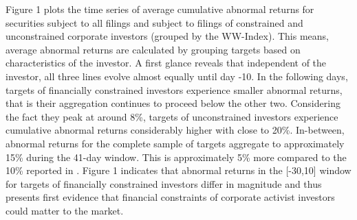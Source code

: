 \documentclass[12pt]{article}
\begin{document}
Figure 1 plots the time series of average cumulative abnormal returns for securities subject to all filings and subject to filings of constrained and unconstrained corporate investors (grouped by the WW-Index). This means, average abnormal returns are calculated by grouping targets based on characteristics of the investor. A first glance reveals that independent of the investor, all three lines evolve almost equally until day -10. In the following days, targets of financially constrained investors experience smaller abnormal returns, that is their aggregation continues to proceed below the other two. Considering the fact they peak at around 8\%, targets of unconstrained investors experience cumulative abnormal returns considerably higher with close to 20\%. In-between, abnormal returns for the complete sample of targets aggregate to approximately 15\% during the 41-day window. This is approximately 5\% more compared to the 10\% reported in \citet[p.1563]{Collin-Dufresne2015}. 
Figure 1 indicates that abnormal returns in the [-30,10] window for targets of financially constrained investors differ in magnitude and thus presents first evidence that financial constraints of corporate activist investors could matter to the market.
\end{document}
